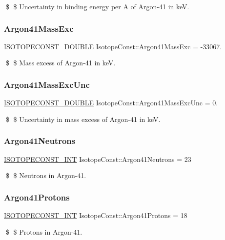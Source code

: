 \$ \$ Uncertainty in binding energy per A of Argon-\/41 in keV. \mbox{\label{group___isotope_const-_argon-_ar41_ga868cd5d9c19cdfc200e595c8674717f2}} 
\subsubsection{\texorpdfstring{Argon41\+Mass\+Exc}{Argon41MassExc}}
{\footnotesize\ttfamily \mbox{\hyperlink{group___isotope_const-_macros_ga8f45a7272ce02c0b4c65c44636ed719a}{I\+S\+O\+T\+O\+P\+E\+C\+O\+N\+S\+T\+\_\+\+D\+O\+U\+B\+LE}} Isotope\+Const\+::\+Argon41\+Mass\+Exc = -\/33067.}

\$ \$ Mass excess of Argon-\/41 in keV. \mbox{\label{group___isotope_const-_argon-_ar41_ga7fa430979476564dee470f7bfc0a4723}} 
\subsubsection{\texorpdfstring{Argon41\+Mass\+Exc\+Unc}{Argon41MassExcUnc}}
{\footnotesize\ttfamily \mbox{\hyperlink{group___isotope_const-_macros_ga8f45a7272ce02c0b4c65c44636ed719a}{I\+S\+O\+T\+O\+P\+E\+C\+O\+N\+S\+T\+\_\+\+D\+O\+U\+B\+LE}} Isotope\+Const\+::\+Argon41\+Mass\+Exc\+Unc = 0.}

\$ \$ Uncertainty in mass excess of Argon-\/41 in keV. \mbox{\label{group___isotope_const-_argon-_ar41_ga84abbc33c89e03eab733c86fd6a5dc23}} 
\subsubsection{\texorpdfstring{Argon41\+Neutrons}{Argon41Neutrons}}
{\footnotesize\ttfamily \mbox{\hyperlink{group___isotope_const-_macros_ga5f18360b3e99483a35c32d789e62621c}{I\+S\+O\+T\+O\+P\+E\+C\+O\+N\+S\+T\+\_\+\+I\+NT}} Isotope\+Const\+::\+Argon41\+Neutrons = 23}

\$ \$ Neutrons in Argon-\/41. \mbox{\label{group___isotope_const-_argon-_ar41_gaef6b5556ad07f51a5aeec05001eadeb6}} 
\subsubsection{\texorpdfstring{Argon41\+Protons}{Argon41Protons}}
{\footnotesize\ttfamily \mbox{\hyperlink{group___isotope_const-_macros_ga5f18360b3e99483a35c32d789e62621c}{I\+S\+O\+T\+O\+P\+E\+C\+O\+N\+S\+T\+\_\+\+I\+NT}} Isotope\+Const\+::\+Argon41\+Protons = 18}

\$ \$ Protons in Argon-\/41. 